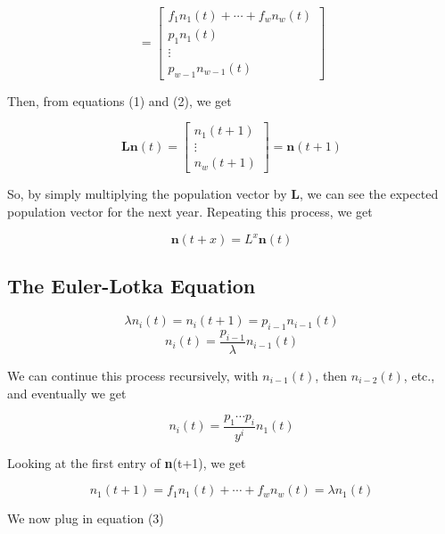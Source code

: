 \documentclass{article}
\begin{document}
\begin{equation*}
= \begin{bmatrix}
f_1n_1(t) + \cdots + f_wn_w(t) \\
p_1n_1(t) \\
\vdots \\
p_{w-1}n_{w-1}(t)
\end{bmatrix}
\end{equation*}

Then, from equations (1) and (2), we get

\begin{equation*}
\mathbf{Ln}(t)= \begin{bmatrix}
n_1(t+1) \\
\vdots \\
n_w(t+1)
\end{bmatrix}
=\mathbf{n}(t+1)
\end{equation*}

So, by simply multiplying the population vector by \textbf{L}, we can see the expected population vector for the next year. Repeating this process, we get

\begin{equation*}
\mathbf{n}(t+x)=L^x\textbf{n}(t)
\end{equation*}

\subsection{The Euler-Lotka Equation}


\begin{equation*}
\lambda n_{i}(t)=n_i(t+1)=p_{i-1}n_{i-1}(t)
\end{equation*}
\begin{equation*}
n_{i}(t)= \dfrac{p_{i-1}}{\lambda}n_{i-1}(t)
\end{equation*}

We can continue this process recursively, with $ n_{i-1}(t) $, then $ n_{i-2}(t) $, etc., and eventually we get

\begin{equation}
n_i(t)= \frac{p_1 \cdots p_{i}}{y^i}n_1(t)
\end{equation}

Looking at the first entry of \textbf{n}(t+1), we get

\begin{equation*}
n_1(t+1)=f_1n_1(t)+ \cdots + f_wn_w(t) = \lambda n_1(t)
\end{equation*}

We now plug in equation (3)
\end{document}
